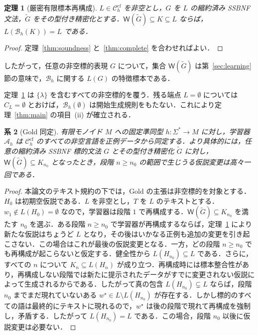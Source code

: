 \documentclass[11pt,a4paper]{ltjsarticle}
\newtheorem{theorem}{定理}[section]
\newtheorem{corollary}[theorem]{系}
\theoremstyle{remark}
\theoremstyle{plain}
\newcommand{\WitnessSet}{\mathsf{W}}
\newcommand{\cf}{\mathrm{cf}}
\newcommand{\Ccf}[1]{\mathcal C_{#1}^{\cf}}
\begin{document}
\begin{theorem}[厳密有限標本再構成]
\label{thm:reconstruction-fixed-h}
$L\in\Ccf{h}$ を非空とし，$G$ を $L$ の縮約済み SSBNF 文法，$\widetilde G$ をその型付き精密化とする．$\WitnessSet(\widetilde G)\subseteq K\subseteq L$ ならば，$L(\mathcal B_h(K))=L$ である．
\end{theorem}
\begin{proof}
定理~\ref{thm:soundness} と~\ref{thm:complete} を合わせればよい．
\end{proof}

したがって，任意の非空標的表現 $G$ について，集合 $\WitnessSet(\widetilde G)$ は第~\ref{sec:learning}節の意味で，$\mathcal B_h$ に関する $L(G)$ の特徴標本である．

定理~\ref{thm:reconstruction-fixed-h} は $\{\lambda\}$ を含むすべての非空標的を覆う．残る端点 $L=\emptyset$ については $C_L=\emptyset$ とおけば，$\mathcal B_h(\emptyset)$ は開始生成規則をもたない．これにより定理~\ref{thm:main} の項目~(ii) が確立される．

\begin{corollary}[Gold 同定]\label{cor:ilt}
有限モノイド $M$ への固定準同型 $h:\Sigma^*\to M$ に対し，学習器 $\mathcal A_h$ は $\Ccf{h}$ のすべての非空言語を正例データから同定する．より具体的には，任意の縮約済み SSBNF 標的文法 $G$ とその型付き精密化 $\widetilde G$ に対し，$\WitnessSet(\widetilde G)\subseteq K_{n_0}$ となったとき，段階 $n\ge n_0$ の範囲で生じうる仮説変更は高々一回である．
\end{corollary}

\begin{proof}
本論文のテキスト規約の下では，Gold の主張は非空標的を対象とする．$H_0$ は初期空仮説である．$L$ を非空とし，$T$ を $L$ のテキストとする．$w_1\notin L(H_0)=\emptyset$ なので，学習器は段階 $1$ で再構成する．$\WitnessSet(\widetilde G)\subseteq K_{n_0}$ を満たす $n_0$ を選ぶ．ある段階 $n\ge n_0$ で学習器が再構成するならば，定理~\ref{thm:reconstruction-fixed-h} により新たな仮説はちょうど $L$ となり，その後はいかなる正例も追加の変更を引き起こさない．この場合はこれが最後の仮説変更となる．一方，どの段階 $n\ge n_0$ でも再構成が起こらないと仮定する．健全性から $L(H_{n_0})\subseteq L$ である．さらに，すべての $n$ について $K_n\subseteq L(H_n)$ が成り立つ．再構成時には標本整合性があり，再構成しない段階では新たに提示されたデータがすでに変更されない仮説によって生成されるからである．したがって真の包含 $L(H_{n_0})\subsetneq L$ ならば，段階 $n_0$ までまだ現れていないある $w^\star\in L\setminus L(H_{n_0})$ が存在する．しかし標的のすべての語は最終的にテキストに現れるので，$w^\star$ は後の段階で現れて再構成を強制し，矛盾する．したがって $L(H_{n_0})=L$ である．この場合，段階 $n_0$ 以後に仮説変更は必要ない．
\end{proof}
\end{document}
